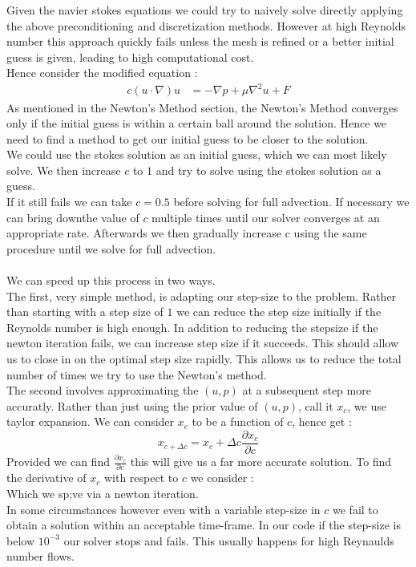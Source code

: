 \documentclass[11pt,twoside,a4paper]{article}
\begin{document}
Given the navier stokes equations we could try to naively solve directly applying the above preconditioning and discretization methods. However at high Reynolds number this approach quickly fails unless the mesh is refined or a better initial guess is given, leading to high computational cost.\\
Hence consider the modified equation :
\begin{align}
c (u \cdot \nabla) u &= -\nabla p + \mu \nabla^2 u + F
\end{align}
As mentioned in the Newton's Method section, the Newton's Method converges only if the initial guess is within a certain ball around the solution. Hence we need to find a method to get our initial guess to be closer to the solution.\\
We could use the stokes solution as an initial guess, which we can most likely solve. We then increase $c$ to $1$ and try to solve using the stokes solution as a guess. \\
If it still fails we can take $c =0.5$ before solving for full advection. If necessary we can bring downthe value of $c$ multiple times until our solver converges at an appropriate rate. Afterwards we then gradually increase c using the same procedure until we solve for full advection.\\
\\
We can speed up this process in two ways.\\
The first, very simple method, is adapting our step-size to the problem. Rather than starting with a step size of $1$ we can reduce the step size initially if the Reynolds number is high enough. In addition to reducing the stepsize if the newton iteration fails, we can increase step size if it succeeds. This should allow us to close in on the optimal step size rapidly. This allows us to reduce the total number of times we try to use the Newton's method.\\
The second involves approximating the $(u,p)$ at a subsequent step more accuratly. Rather than just using the prior value of $(u,p)$, call it $x_c$, we use taylor expansion. We can consider $x_c$ to be a function of $c$, hence get :
$$
x_{c+\Delta c} = x_c + \Delta c \frac{\partial x_c}{\partial c}
$$
Provided we can find $\frac{\partial x_c}{\partial c}$ this will give us a far more accurate solution.
To find the derivative of $x_c$ with respect to $c$ we consider :\\

Which we sp;ve via a newton iteration.\\
In some circumstances however even with a variable step-size in $c$ we fail to obtain a solution within an acceptable time-frame. In our code if the step-size is below $10^{-3}$ our solver stops and fails. This usually happens for high Reynaulds number flows.
\end{document}
